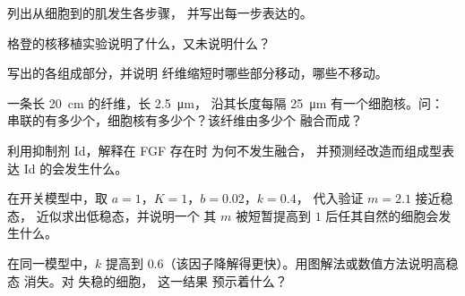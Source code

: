 \begin{exercise}[$\star$]\label{exo:b2:cell-differentiation:2}
列出从细胞到的肌发生各步骤，
并写出每一步表达的。
\end{exercise}

\begin{exercise}[$\star$]\label{exo:b2:cell-differentiation:3}
格登的核移植实验说明了什么，又未说明什么？
\end{exercise}

\begin{exercise}[$\star$]\label{exo:b2:cell-differentiation:4}
写出的各组成部分，并说明
纤维缩短时哪些部分移动，哪些不移动。
\end{exercise}

\begin{exercise}[$\star\star$]\label{exo:b2:cell-differentiation:5}
一条长 \qty{20}{cm} 的纤维，长 \qty{2.5}{\micro m}，
沿其长度每隔 \qty{25}{\micro m} 有一个细胞核。问：
串联的有多少个，细胞核有多少个？该纤维由多少个
融合而成？
\end{exercise}

\begin{exercise}[$\star\star$]\label{exo:b2:cell-differentiation:6}
利用抑制剂 Id，解释在 FGF 存在时
为何不发生融合，
并预测经改造而组成型表达 Id 的会发生什么。
\end{exercise}

\begin{exercise}[$\star\star$]\label{exo:b2:cell-differentiation:7}
在开关模型中，取 $a = 1$，$K = 1$，$b = 0.02$，$k = 0.4$，
代入验证 $m = 2.1$ 接近稳态，
近似求出低稳态，并说明一个
其 $m$ 被短暂提高到 $1$ 后任其自然的细胞会发生什么。
\end{exercise}

\begin{exercise}[$\star\star$]\label{exo:b2:cell-differentiation:8}
在同一模型中，$k$ 提高到 $0.6$（该因子降解得更快）。用图解法或数值方法说明高稳态
消失。对  失稳的细胞，
这一结果
预示着什么？
\end{exercise}

